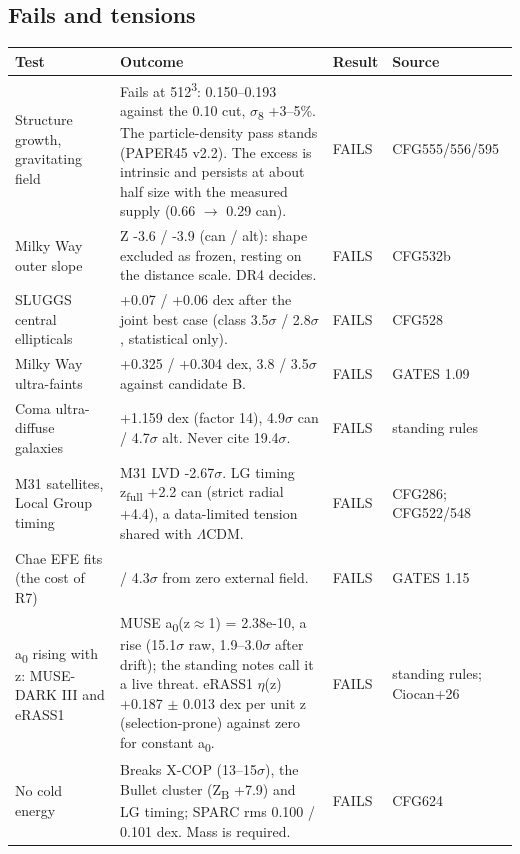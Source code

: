 \documentclass[10pt]{article}
\begin{document}
\subsection*{Fails and tensions}
{\footnotesize\begin{longtable}{>{\raggedright\arraybackslash}p{4.4cm}>{\raggedright\arraybackslash}p{11.6cm}>{\raggedright\arraybackslash}p{2.0cm}>{\raggedright\arraybackslash}p{3.4cm}}
\toprule\textbf{Test} & \textbf{Outcome} & \textbf{Result} & \textbf{Source}\\\midrule\endhead
Structure growth, gravitating field & Fails at 512\textsuperscript{3}: 0.150--0.193 against the 0.10 cut, \ensuremath{\sigma}\textsubscript{8} +3--5\%. The particle-density pass stands (PAPER45 v2.2). The excess is intrinsic and persists at about half size with the measured supply (0.66 \ensuremath{\rightarrow} 0.29 can). & FAILS & CFG555/556/595 \\
Milky Way outer slope & Z -3.6 / -3.9 (can / alt): shape excluded as frozen, resting on the distance scale. DR4 decides. & FAILS & CFG532b \\
SLUGGS central ellipticals & +0.07 / +0.06 dex after the joint best case (class 3.5\ensuremath{\sigma} / 2.8\ensuremath{\sigma}, statistical only). & FAILS & CFG528 \\
Milky Way ultra-faints & +0.325 / +0.304 dex, 3.8 / 3.5\ensuremath{\sigma} against candidate B. & FAILS & GATES 1.09 \\
Coma ultra-diffuse galaxies & +1.159 dex (factor 14), 4.9\ensuremath{\sigma} can / 4.7\ensuremath{\sigma} alt. Never cite 19.4\ensuremath{\sigma}. & FAILS & standing rules \\
M31 satellites, Local Group timing & M31 LVD -2.67\ensuremath{\sigma}. LG timing z\textsubscript{full} +2.2 can (strict radial +4.4), a data-limited tension shared with \ensuremath{\Lambda}CDM. & FAILS & CFG286; CFG522/548 \\
Chae EFE fits (the cost of R7) & 4.1 / 4.3\ensuremath{\sigma} from zero external field. & FAILS & GATES 1.15 \\
a\textsubscript{0} rising with z: MUSE-DARK III and eRASS1 & MUSE a\textsubscript{0}(z\ensuremath{\approx}1) = 2.38e-10, a rise (15.1\ensuremath{\sigma} raw, 1.9--3.0\ensuremath{\sigma} after drift); the standing notes call it a live threat. eRASS1 \ensuremath{\eta}(z) +0.187 \ensuremath{\pm} 0.013 dex per unit z (selection-prone) against zero for constant a\textsubscript{0}. & FAILS & standing rules; Ciocan+26 \\
No cold energy & Breaks X-COP (13--15\ensuremath{\sigma}), the Bullet cluster (Z\textsubscript{B} +7.9) and LG timing; SPARC rms 0.100 / 0.101 dex. Mass is required. & FAILS & CFG624 \\

\end{longtable}}
\end{document}

